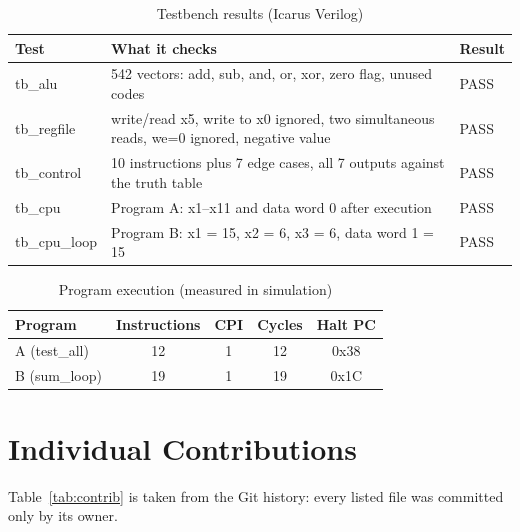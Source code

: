 \documentclass[conference]{IEEEtran}
\begin{document}
\begin{table}[h]
\centering\footnotesize\setlength{\tabcolsep}{3pt}
\caption{Testbench results (Icarus Verilog)}
\label{tab:results}
\begin{tabular}{lL{4.2cm}l}
\toprule
Test & What it checks & Result \\
\midrule
tb\_alu     & 542 vectors: add, sub, and, or, xor, zero flag, unused codes & PASS \\
tb\_regfile & write/read x5, write to x0 ignored, two simultaneous reads, we=0 ignored, negative value & PASS \\
tb\_control & 10 instructions plus 7 edge cases, all 7 outputs against the truth table & PASS \\
tb\_cpu     & Program A: x1--x11 and data word 0 after execution & PASS \\
tb\_cpu\_loop & Program B: x1 = 15, x2 = 6, x3 = 6, data word 1 = 15 & PASS \\
\bottomrule
\end{tabular}
\end{table}

\begin{table}[h]
\centering\scriptsize\setlength{\tabcolsep}{3pt}
\caption{Program execution (measured in simulation)}
\label{tab:programs}
\begin{tabular}{lcccc}
\toprule
Program & Instructions & CPI & Cycles & Halt PC \\
\midrule
A (test\_all)  & 12 & 1 & 12 & 0x38 \\
B (sum\_loop)  & 19 & 1 & 19 & 0x1C \\
\bottomrule
\end{tabular}
\end{table}

\section{Individual Contributions}
Table~\ref{tab:contrib} is taken from the Git history: every listed file was
committed only by its owner.
\end{document}
